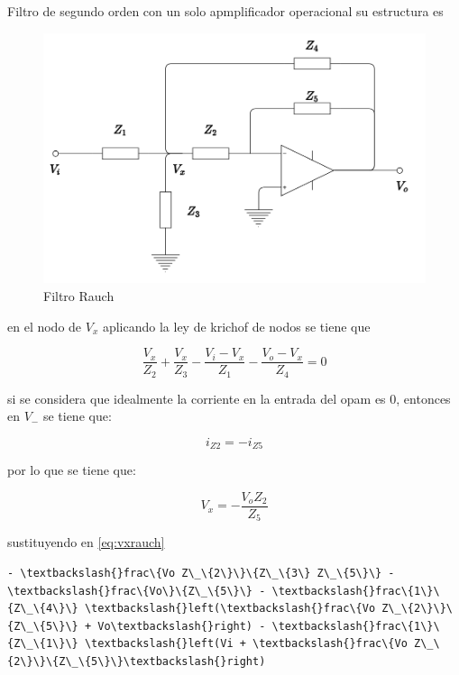 \documentclass{article}
\begin{document}
Filtro de segundo orden con un solo apmplificador operacional su
estructura es

\begin{figure}[htbp]
\centering
\includegraphics{images/filter_rauch.png}
\caption{Filtro Rauch}
\end{figure}

en el nodo de $V_{x}$ aplicando la ley de krichof de nodos se tiene que

\begin{equation}\label{eq:vxrauch}
\frac{V_{x}}{Z_{2}}+\frac{V_{x}}{Z_{3}}-\frac{V_{i}-V_{x}}{Z_{1}}-\frac{V_{o}-V_{x}}{Z_{4}}=0
\end{equation}

si se considera que idealmente la corriente en la entrada del opam es 0,
entonces en $V_{-}$ se tiene que:

\begin{equation}\label{eq:v-rauch}
i_{Z2}=-i_{Z5}
\end{equation}

por lo que se tiene que:

\begin{equation}
V_{x}=-\frac{V_{o}Z_{2}}{Z_{5}}
\end{equation}

sustituyendo en \eqref{eq:vxrauch}


    \begin{Verbatim}[commandchars=\\\{\}]
- \textbackslash{}frac\{Vo Z\_\{2\}\}\{Z\_\{3\} Z\_\{5\}\} - \textbackslash{}frac\{Vo\}\{Z\_\{5\}\} - \textbackslash{}frac\{1\}\{Z\_\{4\}\} \textbackslash{}left(\textbackslash{}frac\{Vo Z\_\{2\}\}\{Z\_\{5\}\} + Vo\textbackslash{}right) - \textbackslash{}frac\{1\}\{Z\_\{1\}\} \textbackslash{}left(Vi + \textbackslash{}frac\{Vo Z\_\{2\}\}\{Z\_\{5\}\}\textbackslash{}right)
    \end{Verbatim}
\end{document}
